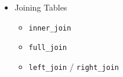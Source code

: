 \documentclass[
]{book}
\providecommand{\tightlist}{%
  \setlength{\itemsep}{0pt}\setlength{\parskip}{0pt}}
\begin{document}
\begin{itemize}
\tightlist
\item
  Joining Tables

  \begin{itemize}
  \tightlist
  \item
    \texttt{inner\_join}
  \item
    \texttt{full\_join}
  \item
    \texttt{left\_join} / \texttt{right\_join}
  \end{itemize}
\end{itemize}

  
\end{document}
